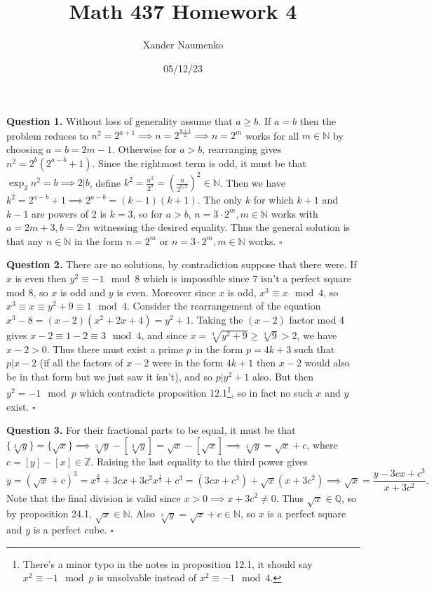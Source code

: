 \documentclass[letterpaper, reqno,11pt]{article}
\begin{document}
\title{Math 437 Homework 4}
\date{05/12/23}
\author{Xander Naumenko}
\maketitle

{\medskip\noindent\bf Question 1.} Without loss of generality assume that $a\geq b$. If $a=b$ then the problem reduces to $n^2=2^{a+1}\implies n=2^{\frac{a+1}{2}}\implies n=2^{m}$ works for all $m\in \mathbb{N}$ by choosing $a=b=2m-1$. Otherwise for $a>b$, rearranging gives $n^2=2^{b}\left( 2^{a-b}+1 \right)$. Since the rightmost term is odd, it must be that $\exp_2 n^2=b\implies 2|b$, define $k^2=\frac{n^2}{2^{b}}= \left( \frac{n}{2^{b /2}} \right)^2\in \mathbb{N}$. Then we have $k^2=2^{a-b}+1\implies 2^{a-b}=(k-1)(k+1)$. The only $k$ for which $k+1$ and $k-1$ are powers of $2$ is $k=3$, so for $a>b$, $n=3\cdot 2^{m}, m\in \mathbb{N}$ works with $a=2m+3,b=2m$ witnessing the desired equality. Thus the general solution is that any $n\in \mathbb{N}$ in the form $n=2^{m}$ or $n=3\cdot 2^{m},m\in \mathbb{N}$ works. $\square$

\medskip

{\medskip\noindent\bf Question 2.} There are no solutions, by contradiction suppose that there were. If $x$ is even then $y^2\equiv -1\mod 8$ which is impossible since $7$ isn't a perfect square mod 8, so $x$ is odd and $y$ is even. Moreover since $x$ is odd, $x^{3}\equiv x\mod 4$, so $x^{3}\equiv x\equiv y^2+9\equiv 1\mod 4$. Consider the rearrangement of the equation $x^{3}-8=(x-2)(x^2+2x+4)=y^2+1$. Taking the $(x-2)$ factor mod 4 gives $x-2\equiv 1-2\equiv 3\mod 4$, and since $x= \sqrt[3]{y^2+9}\geq \sqrt[3]{9}>2$, we have $x-2>0$. Thus there must exist a prime $p$ in the form $p=4k+3$ such that $p|x-2$ (if all the factors of $x-2$ were in the form $4k+1$ then $x-2$ would also be in that form but we just saw it isn't), and so $p|y^2+1$ also. But then $y^2=-1\mod p$ which contradicts proposition 12.1\footnote{There's a minor typo in the notes in proposition 12.1, it should say $x^2\equiv -1\mod p$ is unsolvable instead of $x^2\equiv -1\mod 4$.}, so in fact no such $x$ and $y$ exist. $\square$

\medskip

{\medskip\noindent\bf Question 3.} For their fractional parts to be equal, it must be that $\{\sqrt[3]{y}\}=\{\sqrt{x}\}\implies \sqrt[3]{y}-[\sqrt[3]{y}]=\sqrt{x}-[\sqrt{x}]\implies\sqrt[3]{y}=\sqrt{x}+c$, where $c=[y]-[x]\in \mathbb{Z}$. Raising the last equality to the third power gives
\[
y=\left( \sqrt{x}+c \right)^{3}=x^{\frac{3}{2}}+3cx+3c^2x^{\frac{1}{2}}+c^{3}=(3cx+c^{3})+\sqrt{x}\left( x+3c^2 \right) \implies \sqrt{x}=\frac{y-3cx+c^{3}}{x+3c^2}
.\]
Note that the final division is valid since $x>0\implies x+3c^2\neq 0$. Thus $\sqrt{x}\in \mathbb{Q}$, so by proposition 24.1, $\sqrt{x}\in \mathbb{N}$. Also $\sqrt[3]{y}=\sqrt{x}+c\in \mathbb{N}$, so $x$ is a perfect square and $y$ is a perfect cube. $\square$
\end{document}
